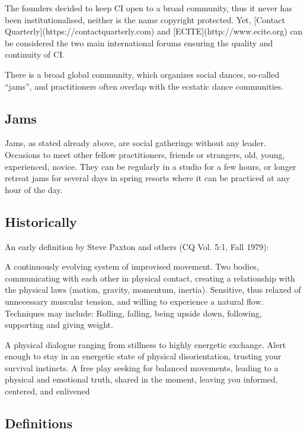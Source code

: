 The founders decided to keep CI open to a broad community, thus it never has been institutionalised, neither is the name copyright protected.
Yet, [Contact Quarterly](https://contactquarterly.com) and [ECITE](http://www.ecite.org) can be considered the two main international forums ensuring the quality and continuity of CI.

There is a broad global community, which organizes social dances, so-called ``jams'', and practitioners often overlap with the ecstatic dance communities.

\subsection{Jams}\label{subsec:jams}

Jams, as stated already above, are social gatherings without any leader.
Occasions to meet other fellow practitioners, friends or strangers, old, young, experienced, novice.
They can be regularly in a studio for a few hours, or longer retreat jams for several days in spring resorts where it can be practiced at any hour of the day.

\subsection{Historically}\label{subsec:historically}

An early definition by Steve Paxton and others (CQ Vol. 5:1, Fall 1979):

A continuously evolving system of improvised movement.
Two bodies, communicating with each other in physical contact, creating a relationship with the physical laws (motion, gravity, momentum, inertia).
Sensitive, thus relaxed of unnecessary muscular tension, and willing to experience a natural flow.
Techniques may include: Rolling, falling, being upside down, following, supporting and giving weight.

A physical dialogue ranging from stillness to highly energetic exchange.
Alert enough to stay in an energetic state of physical disorientation, trusting your survival instincts.
A free play seeking for balanced movements, leading to a physical and emotional truth, shared in the moment, leaving you informed, centered, and enlivened

\subsection{Definitions}\label{subsec:definitions}

